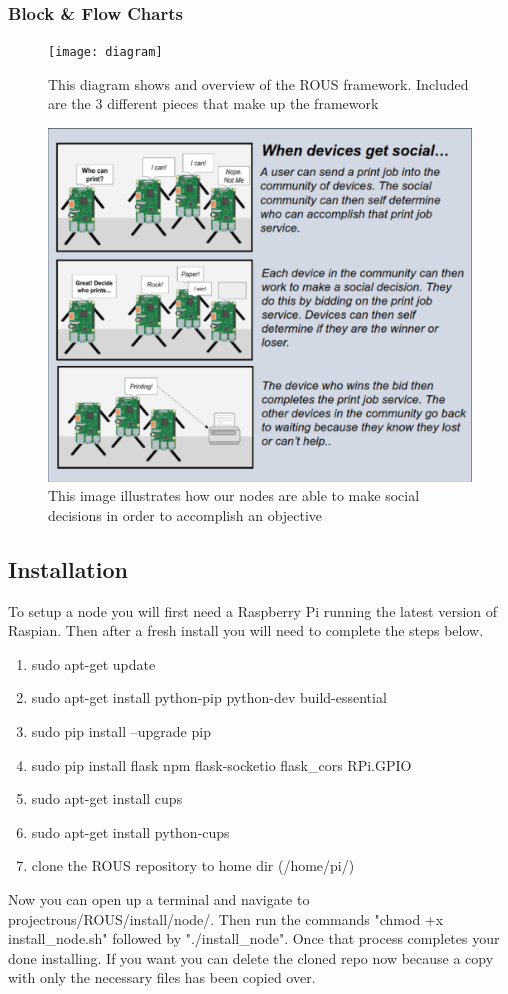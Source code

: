 \documentclass[draftclsnofoot, onecolumn, compsoc, 10pt]{IEEEtran}
\begin{document}
\subsubsection{Block \& Flow Charts}
\begin{figure}[H]
\centering
    \texttt{[image: diagram]}
    \caption{This diagram shows and overview of the ROUS framework. Included are the 3 different pieces that make up the framework}
\end{figure}
\begin{figure}[H]
\centering
    \includegraphics[scale=0.45]{social}
    \caption{This image illustrates how our nodes are able to make social decisions in order to accomplish an objective}
\end{figure}

\subsection{Installation}
To setup a node you will first need a Raspberry Pi running the latest version of Raspian. Then after a fresh install you will need to complete the steps below.
\begin{enumerate}
    \item sudo apt-get update
    \item sudo apt-get install python-pip python-dev build-essential
    \item sudo pip install --upgrade pip
    \item sudo pip install flask npm flask-socketio flask\_cors RPi.GPIO
    \item sudo apt-get install cups
    \item sudo apt-get install python-cups
    \item clone the ROUS repository to home dir (/home/pi/)
\end{enumerate}
Now you can open up a terminal and navigate to projectrous/ROUS/install/node/. Then run the commands "chmod +x install\_node.sh" followed by "./install\_node". Once that process completes your done installing. If you want you can delete the cloned repo now because a copy with only the necessary files has been copied over.
\end{document}
